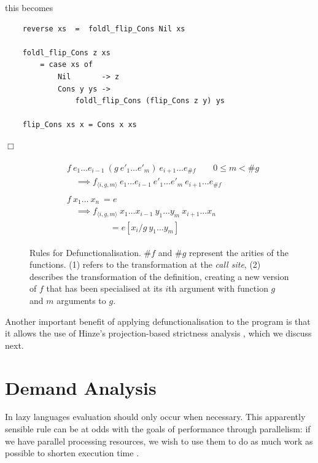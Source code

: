 this becomes

\begin{verbatim}
    reverse xs  =  foldl_flip_Cons Nil xs

    foldl_flip_Cons z xs 
        = case xs of
            Nil       -> z
            Cons y ys ->
                foldl_flip_Cons (flip_Cons z y) ys

    flip_Cons xs x = Cons x xs
\end{verbatim}

\hfill$\Box$

\begin{figure}[t]
 \begin{align}
  \begin{split}
   &f \ e_{1} \dots e_{i-1}\ (g \ e'_{1} \dots e'_{m})\ e_{i+1} \dots e_{\#f} \qquad 0 \leq m < \#g\\
   &\quad \implies f_{\langle i,g,m\rangle} \ e_{1} \dots e_{i-1}\ e'_{1} \dots e'_{m} \ e_{i+1} \dots e_{\#f}
  \end{split}\\[10pt]
  \begin{split}
  &f \ x_{1} \dots \ x_{n} \ = e \\
  &\quad \implies f_{\langle i,g,m\rangle} \ x_{1} \dots x_{i-1}\ y_{1} \dots y_{m}\ x_{i+1} \dots x_{n} \\
  & \qquad \qquad \quad = e[x_{i}/g\ y_{1} \dots y_{m}]
  \end{split}
 \end{align}
\caption{Rules for Defunctionalisation. $\#f$ and $\#g$ represent the arities of the functions.
        (1) refers to the transformation at the \emph{call site},
        (2) describes the transformation of the definition, creating a new version of $f$ that has
        been specialised at its $i$th argument with function $g$ and $m$ arguments to $g$.}
\label{defunRules}
\end{figure}

Another important benefit of applying defunctionalisation to the program is
that it allows the use of Hinze's projection-based strictness analysis
\citep{hinze1995projection}, which we discuss next.

\section{Demand Analysis}
\label{sec:strictness}
%

In lazy languages evaluation should only occur when necessary. This apparently
sensible rule can be at odds with the goals of performance through parallelism:
if we have parallel processing resources, we wish to use them to do as much work
as possible to shorten execution time \citep{tremblay1995impact}.

